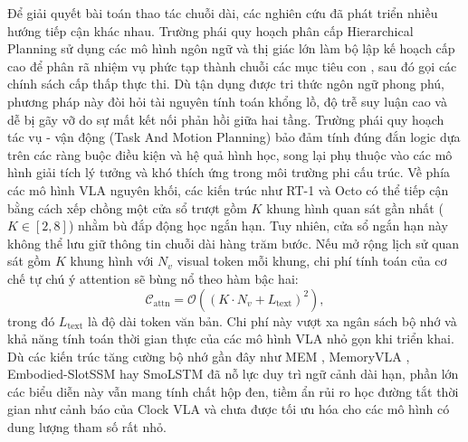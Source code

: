 Để giải quyết bài toán thao tác chuỗi dài, các nghiên cứu đã phát triển nhiều hướng tiếp cận khác nhau. Trường phái quy hoạch phân cấp Hierarchical Planning sử dụng các mô hình ngôn ngữ và thị giác lớn làm bộ lập kế hoạch cấp cao để phân rã nhiệm vụ phức tạp thành chuỗi các mục tiêu con \cite{saycan2022,innermonologue2022,codeaspolicies2023,voxposer2023}, sau đó gọi các chính sách cấp thấp thực thi. Dù tận dụng được tri thức ngôn ngữ phong phú, phương pháp này đòi hỏi tài nguyên tính toán khổng lồ, độ trễ suy luận cao và dễ bị gãy vỡ do sự mất kết nối phản hồi giữa hai tầng. Trường phái quy hoạch tác vụ - vận động (Task And Motion Planning) \cite{garrett2021tamp} bảo đảm tính đúng đắn logic dựa trên các ràng buộc điều kiện và hệ quả hình học, song lại phụ thuộc vào các mô hình giải tích lý tưởng và khó thích ứng trong môi trường phi cấu trúc. Về phía các mô hình VLA nguyên khối, các kiến trúc như RT-1 \cite{rt12022} và Octo \cite{octo2024} có thể tiếp cận bằng cách xếp chồng một cửa sổ trượt gồm $K$ khung hình quan sát gần nhất ($K \in [2, 8]$) nhằm bù đắp động học ngắn hạn. Tuy nhiên, cửa sổ ngắn hạn này không thể lưu giữ thông tin chuỗi dài hàng trăm bước. Nếu mở rộng lịch sử quan sát gồm $K$ khung hình với $N_v$ visual token mỗi khung, chi phí tính toán của cơ chế tự chú ý attention sẽ bùng nổ theo hàm bậc hai:
\begin{equation}
\mathcal{C}_{\mathrm{attn}} = \mathcal{O}\left((K \cdot N_v + L_{\mathrm{text}})^2\right),
\label{eq:quadratic-attention}
\end{equation}
trong đó $L_{\mathrm{text}}$ là độ dài token văn bản. Chi phí này vượt xa ngân sách bộ nhớ và khả năng tính toán thời gian thực của các mô hình VLA nhỏ gọn khi triển khai. Dù các kiến trúc tăng cường bộ nhớ gần đây như MEM \cite{mem2026}, MemoryVLA \cite{memoryvla2026}, Embodied-SlotSSM \cite{liberomem2025} hay SmoLSTM \cite{smoLSTM2026} đã nỗ lực duy trì ngữ cảnh dài hạn, phần lớn các biểu diễn này vẫn mang tính chất hộp đen, tiềm ẩn rủi ro học đường tắt thời gian như cảnh báo của Clock VLA \cite{clockvla2026} và chưa được tối ưu hóa cho các mô hình có dung lượng tham số rất nhỏ.

